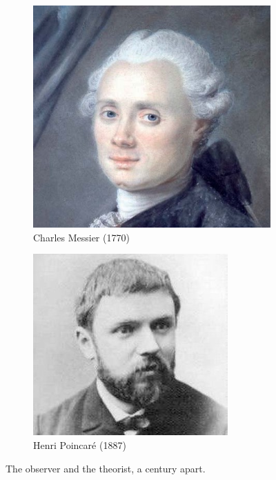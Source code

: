 \begin{figure}
\center
    \centering
    \begin{subfigure}[b]{0.45\textwidth}
    	\centering
    	\includegraphics[width=0.84\linewidth]{Figures/0_messier.jpg}
        \caption{Charles Messier (1770)}
        \label{Fig:0_messier}
    \end{subfigure}
    \begin{subfigure}[b]{0.45\textwidth}
    	\centering
    	\includegraphics[width=0.84\linewidth]{Figures/0_poincare.jpg}
        \caption{Henri Poincar\'e (1887)}
        \label{Fig:0_poincare}
    \end{subfigure}
\caption{The observer and the theorist, a century apart.}
\label{Fig:0_messierpoincare}
\end{figure}

